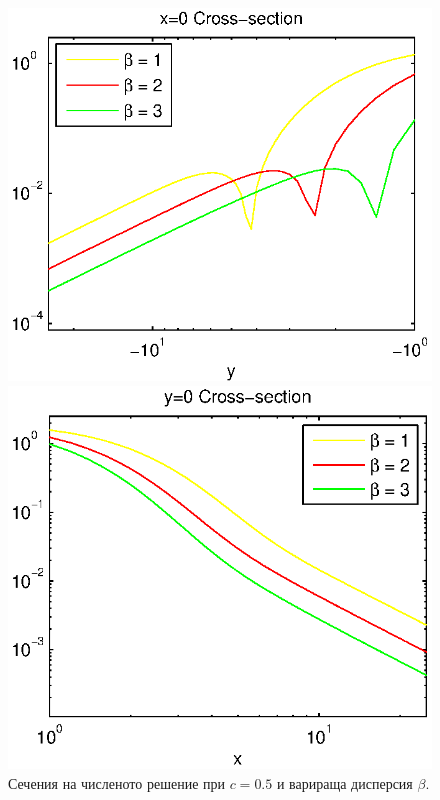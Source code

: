 \documentclass{article}
\begin{document}
\begin{figure}[ht]
\begin{minipage}[b]{0.5\linewidth}
		\includegraphics[width=\linewidth]{../EllipticEquationSJC/cross-sections/c=05beta=1__3Logx=0.eps}
	\end{minipage}	
	\begin{minipage}[b]{0.5\linewidth}
		\raggedright
		 \includegraphics[width=\linewidth]{../EllipticEquationSJC/cross-sections/c=05beta=1__3Logy=0.eps}
	\end{minipage}
	\caption{Сечения на численото решение при $c=0.5$ и варираща дисперсия $\beta$.}
	\label{profilesDispVarying}
\end{figure}
\end{document}

